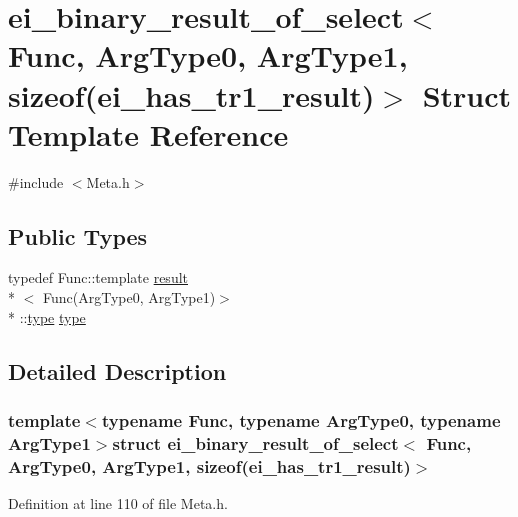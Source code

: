 \hypertarget{structei__binary__result__of__select_3_01_func_00_01_arg_type0_00_01_arg_type1_00_01sizeof_07ei__has__tr1__result_08_4}{\section{ei\-\_\-binary\-\_\-result\-\_\-of\-\_\-select$<$ Func, Arg\-Type0, Arg\-Type1, sizeof(ei\-\_\-has\-\_\-tr1\-\_\-result)$>$ Struct Template Reference}
\label{structei__binary__result__of__select_3_01_func_00_01_arg_type0_00_01_arg_type1_00_01sizeof_07ei__has__tr1__result_08_4}
}


{\ttfamily \#include $<$Meta.\-h$>$}

\subsection*{Public Types}
\begin{DoxyCompactItemize}
\item 
typedef Func\-::template \hyperlink{qxtslotjob_8h_aab161efab0511ea9612b64c40e9852ca}{result}\\*
$<$ Func(Arg\-Type0, Arg\-Type1)$>$\\*
\-::\hyperlink{structei__binary__result__of__select_3_01_func_00_01_arg_type0_00_01_arg_type1_00_01sizeof_07ei__has__tr1__result_08_4_a15a0531e16fefc333da8dab9944e48ec}{type} \hyperlink{structei__binary__result__of__select_3_01_func_00_01_arg_type0_00_01_arg_type1_00_01sizeof_07ei__has__tr1__result_08_4_a15a0531e16fefc333da8dab9944e48ec}{type}
\end{DoxyCompactItemize}


\subsection{Detailed Description}
\subsubsection*{template$<$typename Func, typename Arg\-Type0, typename Arg\-Type1$>$struct ei\-\_\-binary\-\_\-result\-\_\-of\-\_\-select$<$ Func, Arg\-Type0, Arg\-Type1, sizeof(ei\-\_\-has\-\_\-tr1\-\_\-result)$>$}



Definition at line 110 of file Meta.\-h.



